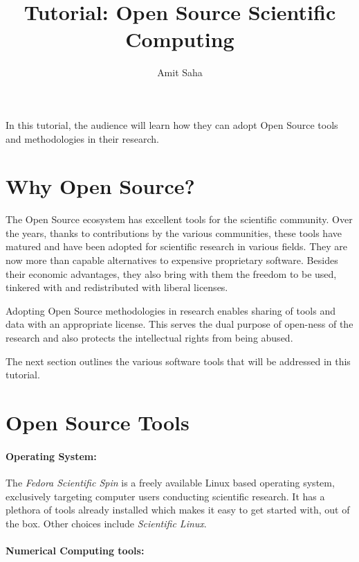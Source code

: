 \documentclass[ifip]{svmult}
\begin{document}
\title{Tutorial: Open Source Scientific Computing}
\author{Amit Saha}

%
\maketitle

In this tutorial, the audience will learn how they can adopt Open
Source tools and methodologies in their research.

\section{Why Open Source?}
\label{sec:1}
The Open Source ecosystem has excellent tools for the scientific
community. Over the years, thanks to contributions by the various
communities, these tools have matured and have been adopted for
scientific research in various fields. They are now more than capable
alternatives to expensive proprietary software. Besides their economic
advantages, they also bring with them the freedom to be used, tinkered
with and redistributed with liberal licenses.  

Adopting Open Source methodologies in research enables sharing of tools and data with an
appropriate license. This serves the dual purpose of open-ness of the research 
and also protects the intellectual rights from being abused. 

The next section outlines the various software tools that will be
addressed in this tutorial.

\section{Open Source Tools}

\paragraph{Operating System:}

The \textit{Fedora Scientific Spin} is a freely available Linux based operating system,
exclusively targeting computer users conducting scientific research. It has a
plethora of tools already installed which makes it easy to get started
with, out of the box. Other choices include \textit{Scientific Linux}.

\paragraph{Numerical Computing tools:}
\end{document}
